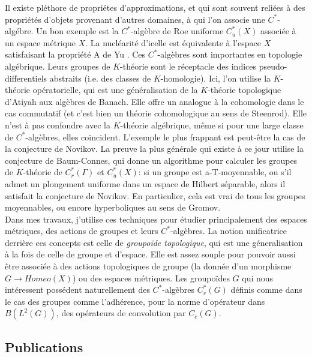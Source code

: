 \documentclass[a4paper,11pt]{article}
\begin{document}
Il existe pl\'ethore de propri\'etes d'approximations, et qui sont souvent reli\'ees \`a des propri\'et\'es d'objets provenant d'autres domaines, \`a qui l'on associe une $C^*$-alg\'ebre. Un bon exemple est la $C^*$-alg\`ebre de Roe uniforme $C^*_u(X)$ associ\'ee \`a un espace m\'etrique $X$. La nucl\'earit\'e d'icelle est \'equivalente \`a l'espace $X$ satisfaisant la propri\'et\'e A de Yu \cite{nowak2008property}. Ces $C^*$-alg\`ebres sont importantes en topologie alg\'ebrique. Leurs groupes de $K$-th\'eorie sont le r\'eceptacle des indices pseudo-differentiels abstraits (i.e. des classes de $K$-homologie). Ici, l'on utilise la $K$-th\'eorie op\'eratorielle, qui est une g\'en\'eralisation de la $K$-th\'eorie topologique d'Atiyah aux alg\`ebres de Banach. Elle offre un analogue \`a la cohomologie dans le cas commutatif (et c'est bien un th\'eorie cohomologique au sens de Steenrod). Elle n'est \`a pas confondre avec la $K$-th\'eorie alg\'ebrique, m\^eme si pour une large classe de $C^*$-alg\`ebres, elles co\"incident. L'exemple le plus frappant est peut-\^etre la cas de la conjecture de Novikov. La preuve la plus g\'en\'erale qui existe \`a ce jour utilise la conjecture de Baum-Connes, qui donne un algorithme pour calculer les groupes de $K$-th\'eorie de $C^*_r(\Gamma)$ et $C_u^*(X)$: si un groupe est a-T-moyennable, ou s'il admet un plongement uniforme dans un espace de Hilbert s\'eparable, alors il satisfait la conjecture de Novikov. En particulier, cela est vrai de tous les groupes moyennables, ou encore hyperboliques au sens de Gromov.\\

Dans mes travaux, j'utilise ces techniques pour \'etudier principalement des espaces m\'etriques, des actions de groupes et leurs $C^*$-alg\`ebres. La notion unificatrice derri\`ere ces concepts est celle de \textit{groupo\"ide topologique}, qui est une g\'eneralisation \`a la fois de celle de groupe et d'espace. Elle est assez souple pour pouvoir aussi \^etre associ\'ee \`a des actions topologiques de groupe (la donn\'ee d'un morphisme $G\rightarrow Homeo(X)$) ou des espaces m\'etriques. Les groupo\"ides $G$ qui nous int\'eressent poss\'edent naturellement des $C^*$-alg\`ebres $C_r^*(G)$ d\'efinis comme dans le cas des groupes comme l'adh\'erence, pour la norme d'op\'erateur dans $B(L^2(G))$, des op\'erateurs de convolution par $C_c(G)$.\\ 

\subsection*{Publications}
\end{document}
